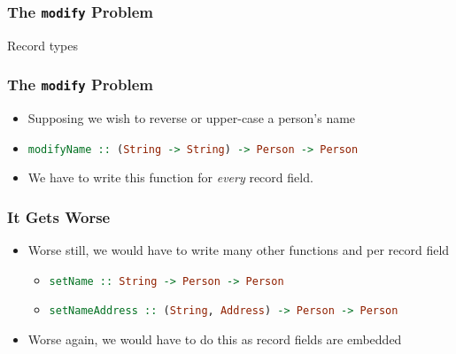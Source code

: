 \begin{frame}
\frametitle{The \lstinline$modify$ Problem}

\begin{block}{Record types}

\end{block}

\end{frame}

\begin{frame}
\frametitle{The \lstinline$modify$ Problem}

\begin{itemize}
\item Supposing we wish to reverse or upper-case a person's name
\item \lstinline[language=haskell]$modifyName :: (String -> String) -> Person -> Person$
\item We have to write this function for \emph{every} record field.
\end{itemize}

\end{frame}

\begin{frame}
\frametitle{It Gets Worse}

\begin{itemize}
\item Worse still, we would have to write many other functions and  per record field
  \begin{itemize}
  \item \lstinline[language=haskell]$setName :: String -> Person -> Person$
  \item \lstinline[language=haskell]$setNameAddress :: (String, Address) -> Person -> Person$
  \end{itemize}
\item Worse again, we would have to do this as record fields are embedded
\end{itemize}

\end{frame}


